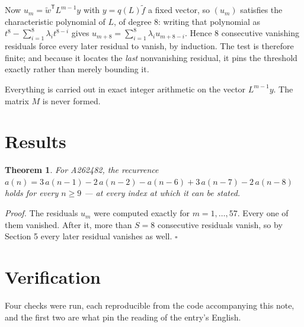 \documentclass[11pt]{article}
\newtheorem{theorem}{Theorem}
\theoremstyle{definition}
\begin{document}
Now $u_m = \tilde w^{\mathsf T} L^{m-1} y$ with $y = q(L)\tilde f$ a fixed vector, so $(u_m)$ satisfies the characteristic polynomial of $L$, of degree $8$: writing that polynomial as $t^{8} - \sum_{i=1}^{8} \lambda_i t^{8-i}$ gives $u_{m+8} = \sum_{i=1}^{8} \lambda_i u_{m+8-i}$. Hence $8$ consecutive vanishing residuals force every later residual to vanish, by induction. The test is therefore finite; and because it locates the {\itshape last} nonvanishing residual, it pins the threshold exactly rather than merely bounding it.

Everything is carried out in exact integer arithmetic on the vector $L^{m-1}y$. The matrix $M$ is never formed.

\section{Results}

\begin{theorem} For A262482, the recurrence $a(n) = 3\,a(n-1) - 2\,a(n-2) - a(n-6) + 3\,a(n-7) - 2\,a(n-8)$ holds for every $n \ge 9$ --- at every index at which it can be stated.\end{theorem}

{\itshape Proof.} The residuals $u_m$ were computed exactly for $m = 1,\dots,57$. Every one of them vanished. After it, more than $S = 8$ consecutive residuals vanish, so by Section 5 every later residual vanishes as well. $\square$

\section{Verification}

Four checks were run, each reproducible from the code accompanying this note, and the first two are what pin the reading of the entry's English.
\end{document}
